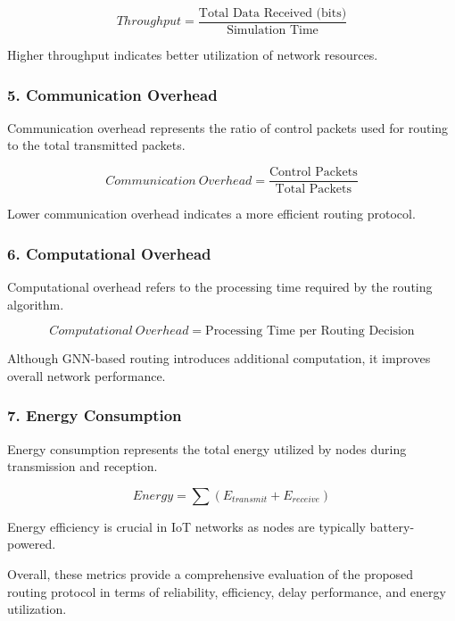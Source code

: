 \documentclass[a4paper,fleqn]{cas-dc}
\numberwithin{equation}{section}
\begin{document}
\begin{equation}
Throughput = \frac{\text{Total Data Received (bits)}}{\text{Simulation Time}}
\end{equation}


Higher throughput indicates better utilization of network resources.

\subsubsection{5. Communication Overhead}

Communication overhead represents the ratio of control packets used for routing to the total transmitted packets.

\begin{equation}
Communication\ Overhead = \frac{\text{Control Packets}}{\text{Total Packets}}
\end{equation}

Lower communication overhead indicates a more efficient routing protocol.

\subsubsection{6. Computational Overhead}

Computational overhead refers to the processing time required by the routing algorithm.

\begin{equation}
Computational\ Overhead = \text{Processing Time per Routing Decision}
\end{equation}

Although GNN-based routing introduces additional computation, it improves overall network performance.

\subsubsection{7. Energy Consumption}

Energy consumption represents the total energy utilized by nodes during transmission and reception.

\begin{equation}
Energy = \sum (E_{transmit} + E_{receive})
\end{equation}

Energy efficiency is crucial in IoT networks as nodes are typically battery-powered.

\bigskip

Overall, these metrics provide a comprehensive evaluation of the proposed routing protocol in terms of reliability, efficiency, delay performance, and energy utilization.
\vspace{6pt}
\end{document}
